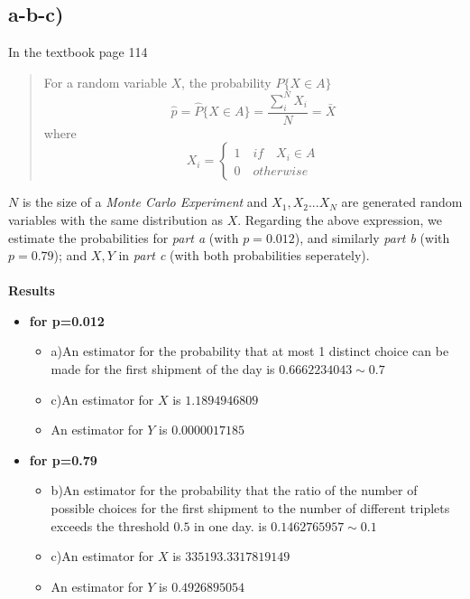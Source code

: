 \documentclass[12pt]{article}
\begin{document}
\subsection*{a-b-c)}
In the textbook page 114
\begin{quotation}
    For a random variable $X$, the probability $P\{X \in A\}$
    $$\hat{p}=\hat{P}\{X \in A\}=\frac{\sum_i^N X_i}{N}=\bar{X}$$
    where $$
        X_i=\begin{cases}
                     1\quad if\quad X_i \in A\\
                     0\quad otherwise
                  \end{cases}
      $$
\end{quotation}
$N$ is the size of a \textit{Monte Carlo Experiment} and $X_1,X_2...X_N$ are 
generated random variables with the same distribution as $X$. Regarding the above
expression, we estimate the probabilities for \textit{part a} (with $p=0.012$), and
similarly \textit{part b} (with $p=0.79$); and $X, Y$ in \textit{part c} 
(with both probabilities seperately).
\\ \\
\textbf{Results}\\
\begin{itemize}
    \item[] \textbf{for p=0.012}
    \begin{itemize}
        \item[] a)An estimator for the probability that at 
        most 1 distinct choice can be made for the first 
        shipment of the day is $0.6662234043 \sim 0.7$
        \item[] c)An estimator for $X$ is $1.1894946809$
        \item[] \quad An estimator for $Y$ is $0.0000017185$
    \end{itemize}
    \item[] \textbf{for p=0.79}
    \begin{itemize}
        \item[] b)An estimator for the probability that the ratio of the
        number of possible choices for the first shipment to the number 
        of different triplets exceeds the threshold $0.5$ in one day.
        is $0.1462765957 \sim 0.1$
        \item[] c)An estimator for $X$ is $335193.3317819149$
        \item[] \quad An estimator for $Y$ is $0.4926895054$
    \end{itemize}
\end{itemize}
\end{document}
